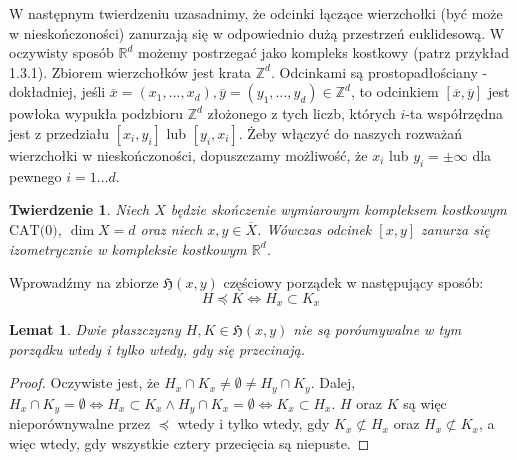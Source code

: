 \documentclass[licencjacka]{pracamgr}
\theoremstyle{definition}
\theoremstyle{definition}
\theoremstyle{definition}
\theoremstyle{definition}
\theoremstyle{definition}
\theoremstyle{plain}
\newtheorem{lemma}{Lemat}[section]
\theoremstyle{plain}
\newtheorem{theorem}{Twierdzenie}[section]
\begin{document}
W następnym twierdzeniu uzasadnimy, że odcinki łączące wierzchołki (być może 
w nieskończoności) zanurzają się w odpowiednio dużą przestrzeń euklidesową. W oczywisty 
sposób $ \mathbb{R}^d $ możemy postrzegać jako kompleks kostkowy (patrz przykład 1.3.1). 
Zbiorem wierzchołków jest krata $ \mathbb{Z}^d $. Odcinkami są prostopadłościany - 
dokładniej, jeśli 
$ \overline{x} = (x_1, \dots, x_d), \overline{y} = (y_1, \dots, y_d)  \in\mathbb{Z}^d $, 
to odcinkiem $ [\overline{x}, \overline{y}] $ jest powłoka wypukła podzbioru $ \mathbb{Z}^d$ 
złożonego z tych liczb, których $ i $-ta współrzędna jest z przedziału $ [x_i, y_i] $ lub
$ [y_i, x_i] $.
Żeby włączyć do naszych rozważań wierzchołki w nieskończoności, dopuszczamy możliwość, że 
$ x_i  $ lub $ y_i = \pm \infty $ dla pewnego $ i = 1 \dots d$.

\begin{theorem} \label{thm:zanurzanie}
	Niech $ X $ będzie skończenie wymiarowym kompleksem kostkowym $ \text{CAT(0)} $, 
	$ \dim{X} = d $ oraz niech $ x,y \in \overline{X} $. Wówczas odcinek $ [x,y] $ zanurza 
	się izometrycznie w kompleksie kostkowym $ \mathbb{R}^d $.
\end{theorem}

Wprowadźmy na zbiorze $ \mathfrak{H}(x,y) $ częściowy porządek w następujący sposób:
$$ H \preceq K \iff H_x \subset K_x $$

\begin{lemma}
	Dwie płaszczyzny $H,K \in \mathfrak{H}(x,y)$ nie są porównywalne w tym 
	porządku wtedy i tylko wtedy, gdy się przecinają.
\end{lemma}
\begin{proof}
	Oczywiste jest, że $ H_x \cap K_x \neq \emptyset \neq H_y \cap K_y $. Dalej, 
	$ H_x \cap K_y = \emptyset \iff H_x \subset K_x  \wedge H_y \cap K_x = \emptyset \iff
	K_x \subset H_x$. $ H $ oraz $ K $ są więc nieporównywalne przez $ \preceq $ wtedy 
	i tylko wtedy, gdy $ K_x \not\subset H_x $ oraz $ H_x \not\subset K_x $, a więc 
	wtedy, gdy wszystkie cztery przecięcia są niepuste.
\end{proof}
\end{document}
